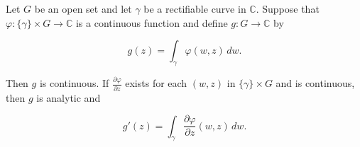 Let $G$ be an open set and let $\gamma$ be a rectifiable curve in $\mathbb{C}$. Suppose that $\varphi: \{\gamma\} \times G \to \mathbb{C}$ is a continuous function and define $g: G \to \mathbb{C}$ by

$$g(z) = \int_{\gamma} \varphi(w, z) \, dw.$$

Then $g$ is continuous. If $\frac{\partial \varphi}{\partial z}$ exists for each $(w, z)$ in $\{\gamma\} \times G$ and is continuous, then $g$ is analytic and

$$g'(z) = \int_{\gamma} \frac{\partial \varphi}{\partial z}(w, z) \, dw.$$

